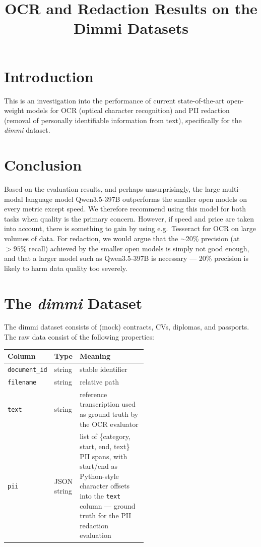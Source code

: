 \documentclass[11pt,a4paper]{article}
\title{\textbf{OCR and Redaction Results on the Dimmi Datasets}}
\author{}
\date{}
\begin{document}
\maketitle

\section{Introduction}

This is an investigation into the performance of current state-of-the-art open-weight models for OCR (optical character recognition) and PII redaction (removal of personally identifiable information from text), specifically for the \emph{dimmi} dataset.

\section{Conclusion}

Based on the evaluation results, and perhaps unsurprisingly, the large multi-modal language model Qwen3.5-397B outperforms the smaller open models on every metric except speed. We therefore recommend using this model for both tasks when quality is the primary concern. However, if speed and price are taken into account, there is something to gain by using e.g.\ Tesseract for OCR on large volumes of data. For redaction, we would argue that the $\sim$20\% precision (at $>95\%$ recall) achieved by the smaller open models is simply not good enough, and that a larger model such as Qwen3.5-397B is necessary --- 20\% precision is likely to harm data quality too severely.

\section{The \emph{dimmi} Dataset}

The dimmi dataset consists of (mock) contracts, CVs, diplomas, and passports. The raw data consist of the following properties:

\begin{table}[H]
\centering
\begin{tabular}{llp{0.55\linewidth}}
\toprule
\textbf{Column} & \textbf{Type} & \textbf{Meaning} \\
\midrule
\texttt{document\_id} & string      & stable identifier \\
\texttt{filename}     & string      & relative path \\
\texttt{text}         & string      & reference transcription used as ground truth by the OCR evaluator \\
\texttt{pii}          & JSON string & list of \{category, start, end, text\} PII spans, with start/end as Python-style character offsets into the \texttt{text} column --- ground truth for the PII redaction evaluation \\
\bottomrule
\end{tabular}
\end{table}
\end{document}
